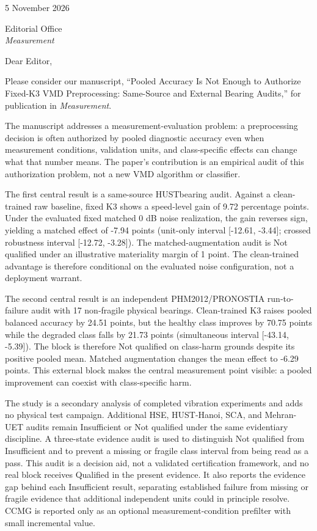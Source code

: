 \documentclass[10pt]{article}
\begin{document}
\linespread{0.95}\selectfont
\setlength{\parskip}{0.35em}

\begin{flushright}
5 November 2026
\end{flushright}

\noindent
Editorial Office\\
\emph{Measurement}

\vspace{0.7em}
\noindent
Dear Editor,

\vspace{0.4em}
Please consider our manuscript, ``Pooled Accuracy Is Not Enough to Authorize
Fixed-K3 VMD Preprocessing: Same-Source and External Bearing Audits,'' for
publication in \emph{Measurement}.

The manuscript addresses a measurement-evaluation problem: a preprocessing
decision is often authorized by pooled diagnostic accuracy even when
measurement conditions, validation units, and class-specific effects can change
what that number means. The paper's contribution is an empirical audit of this
authorization problem, not a new VMD algorithm or classifier.

The first central result is a same-source HUSTbearing audit. Against a
clean-trained raw baseline, fixed K3 shows a speed-level gain of 9.72
percentage points. Under the evaluated fixed matched 0 dB noise realization,
the gain reverses sign, yielding a matched effect of -7.94 points (unit-only
interval [-12.61, -3.44]; crossed robustness interval [-12.72, -3.28]). The
matched-augmentation audit is Not qualified under an illustrative materiality
margin of 1 point. The clean-trained advantage is therefore conditional on the
evaluated noise configuration, not a deployment warrant.

The second central result is an independent PHM2012/PRONOSTIA run-to-failure
audit with 17 non-fragile physical bearings. Clean-trained K3 raises pooled
balanced accuracy by 24.51 points, but the healthy class improves by 70.75
points while the degraded class falls by 21.73 points (simultaneous interval
[-43.14, -5.39]). The block is therefore Not qualified on class-harm grounds
despite its positive pooled mean. Matched augmentation changes the mean effect
to -6.29 points. This external block makes the central measurement point
visible: a pooled improvement can coexist with class-specific harm.

The study is a secondary analysis of completed vibration experiments and adds
no physical test campaign. Additional HSE, HUST-Hanoi, SCA, and Mehran-UET
audits remain Insufficient or Not qualified under the same evidentiary
discipline. A three-state evidence audit is used to distinguish Not qualified
from Insufficient and to prevent a missing or fragile class interval from being
read as a pass. This audit is a decision aid, not a validated certification
framework, and no real block receives Qualified in the present evidence.
It also reports the evidence gap behind each Insufficient result, separating
established failure from missing or fragile evidence that additional independent
units could in principle resolve.
CCMG is reported only as an optional measurement-condition prefilter with small
incremental value.
\end{document}
